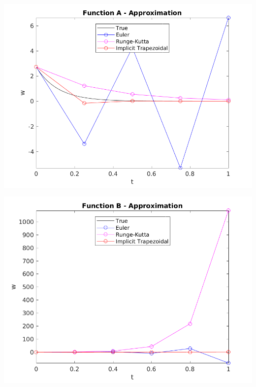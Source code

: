 \documentclass{article}
\begin{document}
\begin{center}
	\centering
    \begin{minipage}{0.5\textwidth}
        \centering
	    \includegraphics[width=1\textwidth]{../additional/unstable/a_compare_val.png}
    \end{minipage}\hfill
    \begin{minipage}{0.5\textwidth}
        \centering
	    \includegraphics[width=1\textwidth]{../additional/unstable/b_compare_val.png}
    \end{minipage}
 	\label{fig:un_compare_val}
\end{center}
\end{document}

